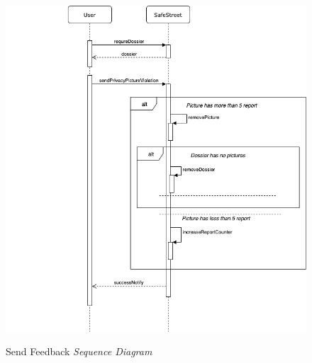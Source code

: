 \documentclass[../RASD.tex]{subfiles}
\begin{document}
                \begin{figure}[H]
                    \centering
                    \includegraphics[scale = 2]{assets/sendFeedbackSD.png}\\[1.6 cm]
                    \caption[Send Feedback \textit{Sequence Diagram}]{Send Feedback \textit{Sequence Diagram}}
                \end{figure}
            \newpage
\end{document}
